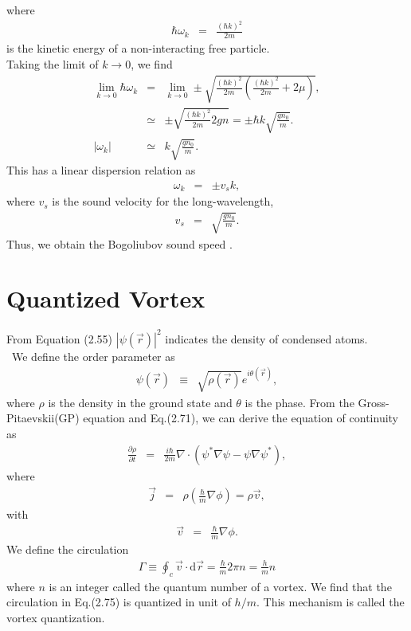 \documentclass[12pt,a4paper]{report}
\newcommand{\diff}{\mathrm{d}}				            %
\begin{document}
where
\begin{eqnarray}
\hbar \omega_k & = & \frac{(\hbar k)^2}{2m}
\end{eqnarray}
is the kinetic energy of a non-interacting free particle.
\\
Taking the limit of $k \rightarrow 0$, we find
\begin{eqnarray}
\lim_{k \rightarrow 0} \hbar \omega_k & = & \lim_{k \rightarrow 0} \pm \sqrt{\frac{(\hbar k)^2}{2m} \left( \frac{(\hbar k)^2}{2m} + 2\mu \right)},
\\
& \simeq & \pm \sqrt{\frac{(\hbar k)^2}{2m} 2 g n} = \pm \hbar k \sqrt{\frac{gn_0}{m}}.
\\
|\omega_k| & \simeq & k \sqrt{\frac{gn_0}{m}}.
\end{eqnarray}
This has a linear dispersion relation as
\begin{eqnarray}
\omega_k & = & \pm v_s k,
\end{eqnarray}
where $v_s$ is the sound velocity for the long-wavelength,
\\
\begin{eqnarray}
v_s & = & \sqrt{\frac{g n_0}{m}}.
\end{eqnarray}
Thus, we obtain the Bogoliubov sound speed \cite{18}.

\section{Quantized Vortex}
From Equation (2.55) $|\psi(\vec{r})|^2$ indicates the density of condensed atoms.
\\
\ We define the order parameter as
\begin{eqnarray}
\psi( \vec{r} ) & \equiv & \sqrt{\rho(\vec{r})} e^{i \theta(\vec{r})},
\end{eqnarray}
where $\rho$ is the density in the ground state and $\theta$ is the phase.
From the Gross-Pitaevskii(GP) equation and Eq.(2.71), we can derive the equation of continuity as
\begin{eqnarray}
\frac{\partial \rho}{\partial t} & = & \frac{i \hbar}{2m} \nabla \cdot ( \psi^* \nabla \psi - \psi \nabla \psi^* ),
\end{eqnarray}
where
\begin{eqnarray}
\vec{j} & = &  \rho \left( \frac{\hbar}{m} \nabla \phi \right) = \rho \vec{v},
\end{eqnarray}
with
\begin{eqnarray}
\vec{v} & = & \frac{\hbar}{m} \nabla \phi.
\end{eqnarray}
We define the circulation
\begin{eqnarray}
\Gamma \equiv \oint_c \vec{v} \cdot \diff \vec{r} = \frac{\hbar}{m} 2 \pi n = \frac{h}{m} n
\end{eqnarray}
where $n$ is an integer called the  quantum number of a vortex. 
We find that the circulation in Eq.(2.75) is quantized in unit of $h/m$.
This mechanism is called the vortex quantization.
\end{document}
